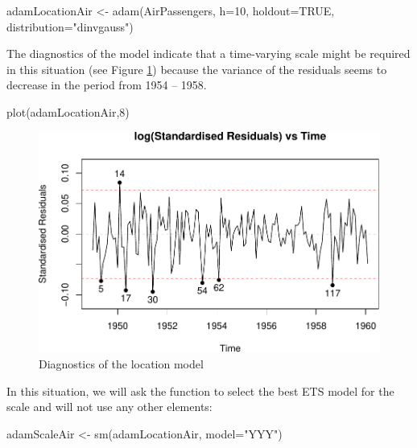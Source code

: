 \documentclass[
]{book}
\newenvironment{Shaded}{\begin{snugshade}}{\end{snugshade}}
\newcommand{\AttributeTok}[1]{\textcolor[rgb]{0.77,0.63,0.00}{#1}}
\newcommand{\ConstantTok}[1]{\textcolor[rgb]{0.00,0.00,0.00}{#1}}
\newcommand{\DecValTok}[1]{\textcolor[rgb]{0.00,0.00,0.81}{#1}}
\newcommand{\FunctionTok}[1]{\textcolor[rgb]{0.00,0.00,0.00}{#1}}
\newcommand{\NormalTok}[1]{#1}
\newcommand{\OtherTok}[1]{\textcolor[rgb]{0.56,0.35,0.01}{#1}}
\newcommand{\StringTok}[1]{\textcolor[rgb]{0.31,0.60,0.02}{#1}}
\theoremstyle{definition}
\theoremstyle{definition}
\theoremstyle{definition}
\theoremstyle{definition}
\theoremstyle{remark}
\begin{document}
\begin{Shaded}
\begin{Highlighting}[]
\NormalTok{adamLocationAir }\OtherTok{\textless{}{-}} \FunctionTok{adam}\NormalTok{(AirPassengers, }\AttributeTok{h=}\DecValTok{10}\NormalTok{, }\AttributeTok{holdout=}\ConstantTok{TRUE}\NormalTok{,}
                        \AttributeTok{distribution=}\StringTok{"dinvgauss"}\NormalTok{)}
\end{Highlighting}
\end{Shaded}

The diagnostics of the model indicate that a time-varying scale might be required in this situation (see Figure \ref{fig:adamModelAirLocationDiagnostics}) because the variance of the residuals seems to decrease in the period from 1954 -- 1958.

\begin{Shaded}
\begin{Highlighting}[]
\FunctionTok{plot}\NormalTok{(adamLocationAir,}\DecValTok{8}\NormalTok{)}
\end{Highlighting}
\end{Shaded}

\begin{figure}
\centering
\includegraphics{Svetunkov--2022----ADAM_files/figure-latex/adamModelAirLocationDiagnostics-1.pdf}
\caption{\label{fig:adamModelAirLocationDiagnostics}Diagnostics of the location model}
\end{figure}

In this situation, we will ask the function to select the best ETS model for the scale and will not use any other elements:

\begin{Shaded}
\begin{Highlighting}[]
\NormalTok{adamScaleAir }\OtherTok{\textless{}{-}} \FunctionTok{sm}\NormalTok{(adamLocationAir, }\AttributeTok{model=}\StringTok{"YYY"}\NormalTok{)}
\end{Highlighting}
\end{Shaded}
\end{document}
